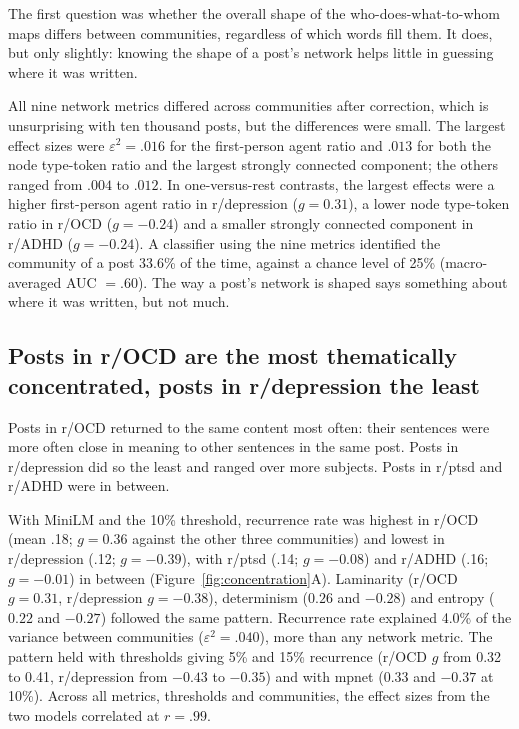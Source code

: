 \documentclass[11pt,a4paper]{article}
\begin{document}
The first question was whether the overall shape of the who-does-what-to-whom maps differs between communities, regardless of which words fill them. It does, but only slightly: knowing the shape of a post's network helps little in guessing where it was written.

All nine network metrics differed across communities after correction, which is unsurprising with ten thousand posts, but the differences were small. The largest effect sizes were $\varepsilon^2 = .016$ for the first-person agent ratio and $.013$ for both the node type-token ratio and the largest strongly connected component; the others ranged from $.004$ to $.012$. In one-versus-rest contrasts, the largest effects were a higher first-person agent ratio in r/depression ($g = 0.31$), a lower node type-token ratio in r/OCD ($g = -0.24$) and a smaller strongly connected component in r/ADHD ($g = -0.24$). A classifier using the nine metrics identified the community of a post 33.6\% of the time, against a chance level of 25\% (macro-averaged AUC $= .60$). The way a post's network is shaped says something about where it was written, but not much.

\subsection{Posts in r/OCD are the most thematically concentrated, posts in r/depression the least}

Posts in r/OCD returned to the same content most often: their sentences were more often close in meaning to other sentences in the same post. Posts in r/depression did so the least and ranged over more subjects. Posts in r/ptsd and r/ADHD were in between.

With MiniLM and the 10\% threshold, recurrence rate was highest in r/OCD (mean .18; $g = 0.36$ against the other three communities) and lowest in r/depression (.12; $g = -0.39$), with r/ptsd (.14; $g = -0.08$) and r/ADHD (.16; $g = -0.01$) in between (Figure~\ref{fig:concentration}A). Laminarity (r/OCD $g = 0.31$, r/depression $g = -0.38$), determinism ($0.26$ and $-0.28$) and entropy ($0.22$ and $-0.27$) followed the same pattern. Recurrence rate explained 4.0\% of the variance between communities ($\varepsilon^2 = .040$), more than any network metric. The pattern held with thresholds giving 5\% and 15\% recurrence (r/OCD $g$ from 0.32 to 0.41, r/depression from $-0.43$ to $-0.35$) and with mpnet ($0.33$ and $-0.37$ at 10\%). Across all metrics, thresholds and communities, the effect sizes from the two models correlated at $r = .99$.
\end{document}
